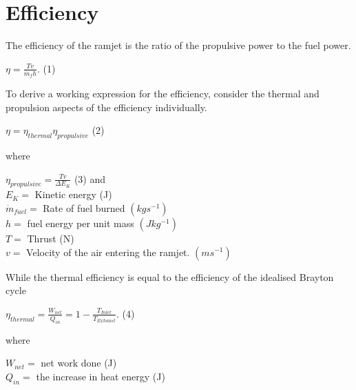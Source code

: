 \documentclass[12pt,onecolumn]{IEEEtran}
\begin{document}
\section{Efficiency}
\begin{flushleft}
The efficiency of the ramjet is the ratio of the propulsive power to the fuel power.\cite{greitzer_spakovsky_waitz}\\
\begin{center}
$ \eta = \frac{Tv}{\dot{m}_f h}.$ (1)
\end{center}
To derive a working expression for the efficiency, consider the thermal and propulsion aspects of the efficiency individually.\\
\begin{center}
$ \eta = \eta_{thermal} \eta_{propulsive}$ (2)
\end{center}
where\\
\begin{center}
$\eta_{propulsive}=\frac{Tv}{\Delta E_K} $ (3)
\vspace{1mm}
and\\
\vspace{2mm}
$
E_K = $ Kinetic energy (J)\\
\vspace{1mm}
$\dot{m}_{fuel} = $ Rate of fuel burned $(kgs^{-1})$\\
\vspace{1mm}
$h = $ fuel energy per unit mass $(Jkg^{-1})$\\
\vspace{1mm}
$T = $ Thrust (N)\\
\vspace{1mm}
$v = $ Velocity of the air entering the ramjet. $(ms^{-1})$\\
\end{center}
While the thermal efficiency is equal to the efficiency of the idealised Brayton cycle\\
\vspace{1mm}
\begin{center}
$\eta_{thermal}=\frac{W_{net}}{Q_{in}}=1-\frac{T_{Inlet}}{T_{Exhaust}}$. (4)\\
\vspace{2mm}
\end{center}
where\\
\begin{center}
$W_{net} = $ net work done (J)\\
\vspace{1mm}
$Q_{in} = $ the increase in heat energy (J)\\

\end{center}
\end{flushleft}
\end{document}
